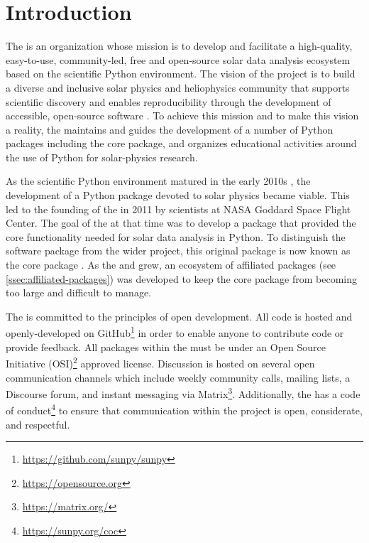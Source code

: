 \section{Introduction}
\label{sec:introduction}

The \sunpyproj is an organization whose mission is to develop and facilitate a high-quality, easy-to-use, community-led, free and open-source solar data analysis ecosystem based on the scientific Python environment.
The vision of the project is to build a diverse and inclusive solar physics and heliophysics community that supports scientific discovery and enables reproducibility through the development of accessible, open-source software \citep{bobra_monica_2020_7020094}.
To achieve this mission and to make this vision a reality, the \sunpyproj maintains and guides the development of a number of Python packages including the \sunpypkg core package, and organizes educational activities around the use of Python for solar-physics research.

As the scientific Python environment matured in the early 2010s \citep{Hunter:2007, harris2020array, 2020SciPy-NMeth}, the development of a Python package devoted to solar physics became viable.
This led to the founding of the \sunpyproj in 2011 by scientists at NASA Goddard Space Flight Center.
The goal of the \sunpyproj at that time was to develop a package that provided the core functionality needed for solar data analysis in Python.
To distinguish the software package from the wider project, this original package is now known as the \sunpypkg core package \citep{sunpy_community2020}.
As the \sunpyproj and \sunpypkg grew, an ecosystem of affiliated packages (see \autoref{ssec:affiliated-packages}) was developed to keep the \sunpypkg core package from becoming too large and difficult to manage.

The \sunpyproj is committed to the principles of open development.
All code is hosted and openly-developed on GitHub\footnote{\url{https://github.com/sunpy/sunpy}} in order to enable anyone to contribute code or provide feedback.
All packages within the \sunpyproj must be under an Open Source Initiative (OSI)\footnote{\url{https://opensource.org}} approved license.
Discussion is hosted on several open communication channels which include weekly community calls, mailing lists, a Discourse forum, and instant messaging via Matrix\footnote{\url{https://matrix.org/}}.
Additionally, the \sunpyproj has a code of conduct\footnote{\url{https://sunpy.org/coc}} to ensure that communication within the project is open, considerate, and respectful.

